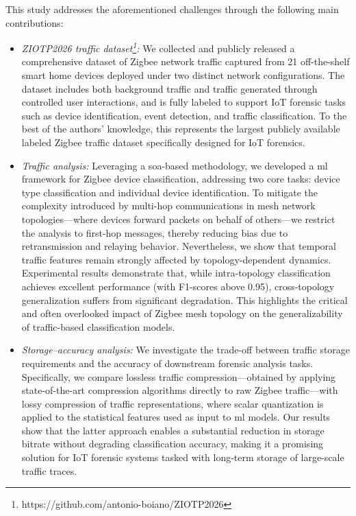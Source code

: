 This study addresses the aforementioned challenges through the following main contributions:
\begin{itemize}
    \item \textit{ZIOTP2026 traffic dataset\footnote{https://github.com/antonio-boiano/ZIOTP2026}:} 
    We collected and publicly released a comprehensive dataset of Zigbee network traffic captured from 21 off-the-shelf smart home devices deployed under two distinct network configurations. The dataset includes both background traffic and traffic generated through controlled user interactions, and is fully labeled to support IoT forensic tasks such as device identification, event detection, and traffic classification. To the best of the authors’ knowledge, this represents the largest publicly available labeled Zigbee traffic dataset specifically designed for IoT forensics.

    \item \textit{Traffic analysis:} 
    Leveraging a \gls*{soa}-based methodology, we developed a \gls*{ml} framework for Zigbee device classification, addressing two core tasks: device type classification and individual device identification. To mitigate the complexity introduced by multi-hop communications in mesh network topologies—where devices forward packets on behalf of others—we restrict the analysis to first-hop messages, thereby reducing bias due to retransmission and relaying behavior. Nevertheless, we show that temporal traffic features remain strongly affected by topology-dependent dynamics. Experimental results demonstrate that, while intra-topology classification achieves excellent performance (with F1-scores above 0.95), cross-topology generalization suffers from significant degradation. This highlights the critical and often overlooked impact of Zigbee mesh topology on the generalizability of traffic-based classification models.

    \item \textit{Storage--accuracy analysis:} 
    We investigate the trade-off between traffic storage requirements and the accuracy of downstream forensic analysis tasks. Specifically, we compare lossless traffic compression—obtained by applying state-of-the-art compression algorithms directly to raw Zigbee traffic—with lossy compression of traffic representations, where scalar quantization is applied to the statistical features used as input to \gls*{ml} models. Our results show that the latter approach enables a substantial reduction in storage bitrate without degrading classification accuracy, making it a promising solution for IoT forensic systems tasked with long-term storage of large-scale traffic traces.
\end{itemize}

